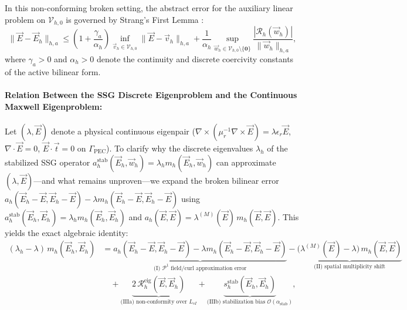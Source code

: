 \documentclass[VANCOUVER]{USG}
\begin{document}
In this non-conforming broken setting, the abstract error for the auxiliary linear problem on $\mathcal{V}_{h,0}$ is governed by Strang's First Lemma \cite{ciarlet2002finite, brenner2008mathematical}:
\begin{equation}
    \|\vec{E} - \vec{E}_h\|_{h, a} \le \left( 1 + \frac{\gamma_a}{\alpha_h} \right) \inf_{\vec{v}_h \in \mathcal{V}_{h,0}} \|\vec{E} - \vec{v}_h\|_{h, a} + \frac{1}{\alpha_h} \sup_{\vec{w}_h \in \mathcal{V}_{h,0} \setminus \{\mathbf{0}\}} \frac{|\mathcal{R}_h(\vec{w}_h)|}{\|\vec{w}_h\|_{h, a}},
    \label{eq:strang_lemma}
\end{equation}
where $\gamma_a > 0$ and $\alpha_h > 0$ denote the continuity and discrete coercivity constants of the active bilinear form.

\paragraph*{Relation Between the SSG Discrete Eigenproblem and the Continuous Maxwell Eigenproblem:\hspace*{0.35em}}
Let $(\lambda, \vec{E})$ denote a physical continuous eigenpair ($\nabla\times(\mu_r^{-1}\nabla\times\vec{E}) = \lambda\epsilon_r\vec{E}$, $\nabla\cdot\vec{E} = 0$, $\vec{E}\cdot\vec{t} = 0$ on $\Gamma_{\mathrm{PEC}}$). To clarify why the discrete eigenvalues $\lambda_h$ of the stabilized SSG operator $a_h^{\mathrm{stab}}(\vec{E}_h, \vec{w}_h) = \lambda_h m_h(\vec{E}_h, \vec{w}_h)$ can approximate $(\lambda, \vec{E})$---and what remains unproven---we expand the broken bilinear error $a_h(\vec{E}_h - \vec{E}, \vec{E}_h - \vec{E}) - \lambda m_h(\vec{E}_h - \vec{E}, \vec{E}_h - \vec{E})$ using $a_h^{\mathrm{stab}}(\vec{E}_h, \vec{E}_h) = \lambda_h m_h(\vec{E}_h, \vec{E}_h)$ and $a_h(\vec{E}, \vec{E}) = \lambda^{(M)}(\vec{E})\,m_h(\vec{E}, \vec{E})$. This yields the exact algebraic identity:
\begin{equation}
    \begin{aligned}
        (\lambda_h - \lambda)\,m_h(\vec{E}_h, \vec{E}_h)
        & = \underbrace{a_h(\vec{E}_h - \vec{E}, \vec{E}_h - \vec{E}) - \lambda m_h(\vec{E}_h - \vec{E}, \vec{E}_h - \vec{E})}_{\text{(I) } \mathcal{P}^1 \text{ field/curl approximation error}}
        - \underbrace{\big(\lambda^{(M)}(\vec{E}) - \lambda\big)\,m_h(\vec{E}, \vec{E})}_{\text{(II) spatial multiplicity shift}} \\
        & \quad + \underbrace{2\,\mathcal{R}_h^{\mathrm{eig}}(\vec{E}, \vec{E}_h)}_{\text{(IIIa) non-conformity over } L_{sI}}
        + \underbrace{s_h^{\mathrm{stab}}(\vec{E}_h, \vec{E}_h)}_{\text{(IIIb) stabilization bias } \mathcal{O}(\alpha_{\mathrm{stab}})},
    \end{aligned}
    \label{eq:spectral_error_decomposition}
\end{equation}
\end{document}
